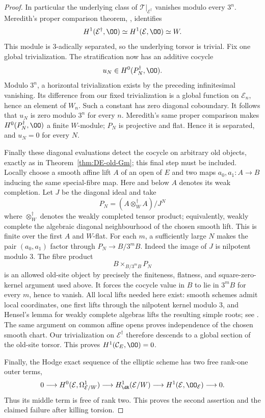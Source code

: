 \begin{proof}
In particular the underlying class of $\mathcal T|_{\mathcal E^\dagger}$ vanishes modulo every $3^n$.  Meredith's proper comparison theorem, \cite[\S5, Theorem~A, p.~25; or its projective Theorem~B]{Meredith1972}, identifies
\[
 H^1(\mathcal E^\dagger,\OO)
                  \simeq H^1(\mathcal E,\OO)\simeq W.
\]
This module is $3$-adically separated, so the underlying torsor is trivial.  Fix one global trivialization.  The stratification now has an additive cocycle
\[
                         u_N\in H^0(P_N^\dagger,\OO).
\]
Modulo $3^n$, a horizontal trivialization exists by the preceding infinitesimal vanishing.  Its difference from our fixed trivialization is a global function on $\mathcal E_n$, hence an element of $W_n$.  Such a constant has zero diagonal coboundary.  It follows that $u_N$ is zero modulo $3^n$ for every $n$.  Meredith's same proper comparison makes $H^0(P_N^\dagger,\OO)$ a finite $W$-module; $P_N$ is projective and flat.  Hence it is separated, and $u_N=0$ for every $N$.

Finally these diagonal evaluations detect the cocycle on arbitrary old objects, exactly as in Theorem~\ref{thm:DE-old-Gm}; this final step must be included.  Locally choose a smooth affine lift $A$ of an open of $E$ and two maps $a_0,a_1:A\to B$ inducing the same special-fibre map.  Here and below $A$ denotes its weak completion.  Let $J$ be the diagonal ideal and take
\[
                         P_N=(A\otimes_W^\dagger A)/J^N
\]
where $\otimes_W^\dagger$ denotes the weakly completed tensor product; equivalently, weakly complete the algebraic diagonal neighbourhood of the chosen smooth lift.  This is finite over the first $A$ and $W$-flat.  For each $m$, a sufficiently large $N$ makes the pair $(a_0,a_1)$ factor through $P_N\to B/3^mB$.  Indeed the image of $J$ is nilpotent modulo $3$.  The fibre product
\[
                         B\times_{B/3^mB}P_N
\]
is an allowed old-site object by precisely the finiteness, flatness, and square-zero-kernel argument used above.  It forces the cocycle value in $B$ to lie in $3^mB$ for every $m$, hence to vanish.  All local lifts needed here exist: smooth schemes admit local \etale coordinates, one first lifts through the nilpotent kernel modulo $3$, and Hensel's lemma for weakly complete algebras lifts the resulting simple roots; see \cite[Proposition~2.31 and the preceding very-smooth lifting discussion]{DavisLangerZink2012}.  The same argument on common affine opens proves independence of the chosen smooth chart.  Our trivialization on $\mathcal E^\dagger$ therefore descends to a global section of the old-site torsor.  This proves $H^1(\mathcal C_E,\OO)=0$.

Finally, the Hodge exact sequence of the elliptic scheme has two free rank-one outer terms,
\[
 0\longrightarrow H^0(\mathcal E,\Omega^1_{\mathcal E/W})
  \longrightarrow H^1_{\dR}(\mathcal E/W)
  \longrightarrow H^1(\mathcal E,\OO_{\mathcal E})\longrightarrow0.
\]
Thus its middle term is free of rank two.  This proves the second assertion and the claimed failure after killing torsion.
\end{proof}


